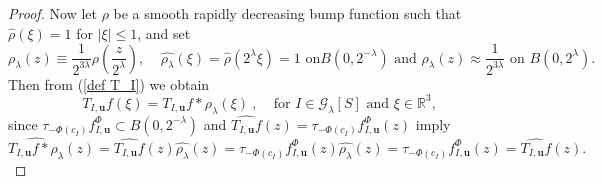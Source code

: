 \documentclass{amsart}%
\theoremstyle{plain}
\numberwithin{equation}{section}
\begin{document}
\begin{proof}
Now let $\rho$ be a smooth rapidly decreasing bump function such that
$\widehat{\rho}\left(  \xi\right)  =1$ for $\left\vert \xi\right\vert \leq1$,
and set%
\[
\rho_{\lambda}\left(  z\right)  \equiv\frac{1}{2^{3\lambda}}\rho\left(
\frac{z}{2^{\lambda}}\right)  ,\ \ \ \ \ \widehat{\rho_{\lambda}}\left(
\xi\right)  =\widehat{\rho}\left(  2^{\lambda}\xi\right)  =1\text{ on
}B\left(  0,2^{-\lambda}\right)  \text{ and }\rho_{\lambda}\left(  z\right)
\approx\frac{1}{2^{3\lambda}}\text{ on }B\left(  0,2^{\lambda}\right)  .
\]
Then from (\ref{def T_I}) we obtain%
\[
T_{I,\mathbf{u}}f\left(  \xi\right)  =T_{I,\mathbf{u}}f\ast\rho_{\lambda
}\left(  \xi\right)  \ ,\ \ \ \ \ \text{for }I\in\mathcal{G}_{\lambda}\left[
S\right]  \text{ and }\xi\in\mathbb{R}^{3},
\]
since $\tau_{-\Phi\left(  c_{I}\right)  }f_{I,\mathbf{u}}^{\Phi}\subset
B\left(  0,2^{-\lambda}\right)  $ and $\widehat{T_{I,\mathbf{u}}f}\left(
z\right)  =\tau_{-\Phi\left(  c_{I}\right)  }f_{I,\mathbf{u}}^{\Phi}\left(
z\right)  $ imply%
\[
\widehat{T_{I,\mathbf{u}}f\ast\rho_{\lambda}}\left(  z\right)  =\widehat
{T_{I,\mathbf{u}}f}\left(  z\right)  \widehat{\rho_{\lambda}}\left(  z\right)
=\tau_{-\Phi\left(  c_{I}\right)  }f_{I,\mathbf{u}}^{\Phi}\left(  z\right)
\widehat{\rho_{\lambda}}\left(  z\right)  =\tau_{-\Phi\left(  c_{I}\right)
}f_{I,\mathbf{u}}^{\Phi}\left(  z\right)  =\widehat{T_{I,\mathbf{u}}f}\left(
z\right)  .
\]



\end{proof}
\end{document}
